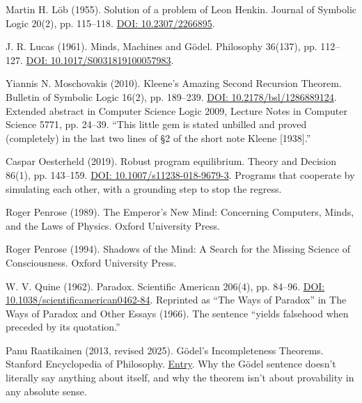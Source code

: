 \noindent Martin H. L\"ob (1955). Solution of a problem of Leon Henkin. Journal of Symbolic Logic 20(2), pp. 115--118. \href{https://doi.org/10.2307/2266895}{DOI: 10.2307/2266895}.
\par\medskip

\noindent J. R. Lucas (1961). Minds, Machines and G\"odel. Philosophy 36(137), pp. 112--127. \href{https://doi.org/10.1017/S0031819100057983}{DOI: 10.1017/S0031819100057983}.
\par\medskip

\noindent Yiannis N. Moschovakis (2010). Kleene's Amazing Second Recursion Theorem. Bulletin of Symbolic Logic 16(2), pp. 189--239. \href{https://doi.org/10.2178/bsl/1286889124}{DOI: 10.2178/bsl/1286889124}. Extended abstract in Computer Science Logic 2009, Lecture Notes in Computer Science 5771, pp. 24--39. ``This little gem is stated unbilled and proved (completely) in the last two lines of \S2 of the short note Kleene [1938].''
\par\medskip

\noindent Caspar Oesterheld (2019). Robust program equilibrium. Theory and Decision 86(1), pp. 143--159. \href{https://doi.org/10.1007/s11238-018-9679-3}{DOI: 10.1007/s11238-018-9679-3}. Programs that cooperate by simulating each other, with a grounding step to stop the regress.
\par\medskip

\noindent Roger Penrose (1989). The Emperor's New Mind: Concerning Computers, Minds, and the Laws of Physics. Oxford University Press.
\par\medskip

\noindent Roger Penrose (1994). Shadows of the Mind: A Search for the Missing Science of Consciousness. Oxford University Press.
\par\medskip

\noindent W. V. Quine (1962). Paradox. Scientific American 206(4), pp. 84--96. \href{https://doi.org/10.1038/scientificamerican0462-84}{DOI: 10.1038/scientificamerican0462-84}. Reprinted as ``The Ways of Paradox'' in The Ways of Paradox and Other Essays (1966). The sentence ``yields falsehood when preceded by its quotation.''
\par\medskip

\noindent Panu Raatikainen (2013, revised 2025). G\"odel's Incompleteness Theorems. Stanford Encyclopedia of Philosophy. \href{https://plato.stanford.edu/entries/goedel-incompleteness/}{Entry}. Why the G\"odel sentence doesn't literally say anything about itself, and why the theorem isn't about provability in any absolute sense.
\par\medskip

